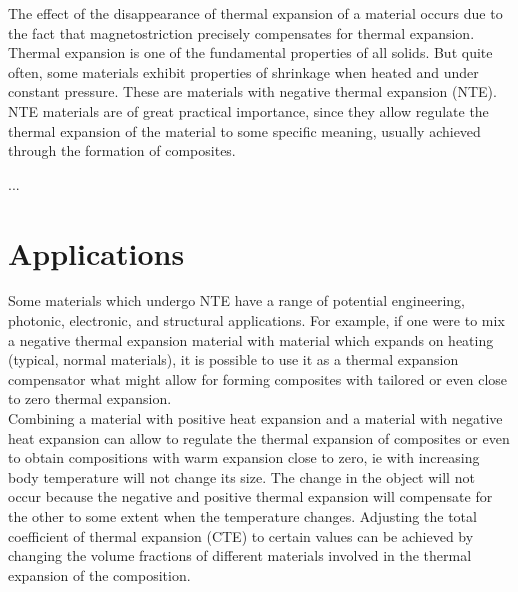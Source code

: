 \documentclass[12pt, a4paper, twocolumn]{article}
\begin{document}
The effect of the disappearance of thermal expansion of a material occurs due to the fact that magnetostriction precisely compensates for thermal expansion. \\

Thermal expansion is one of the fundamental properties of all solids.
But quite often, some materials exhibit properties of shrinkage when heated and under constant pressure. These are materials with negative thermal expansion (NTE). NTE materials are of great practical importance, since they allow
regulate the thermal expansion of the material to
some specific meaning, usually achieved through the formation of composites.

...
\section{Applications}
Some materials which undergo NTE have a range of potential engineering, photonic, electronic, and structural applications. For example, if one were to mix a negative thermal expansion material with  material which expands on heating (typical, normal materials), it is possible to use it as a thermal expansion compensator what might allow for forming composites with tailored or even close to zero thermal expansion. \\ 

Combining a material with positive heat expansion and a material with negative heat expansion can allow to regulate the thermal expansion of composites or even to obtain compositions with warm expansion close to zero, ie with increasing body temperature will not change its size. The change in the object will not occur because the negative and positive thermal expansion will compensate for the other to some extent when the temperature changes. Adjusting the total coefficient of thermal expansion (CTE) to certain values  can be achieved by changing the volume fractions of different materials involved in the thermal expansion of the composition.\\ 
\end{document}
